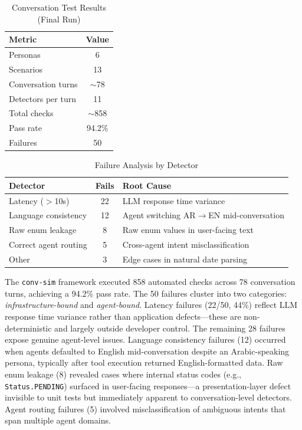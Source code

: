 \documentclass[11pt,a4paper]{article}
\begin{document}
\begin{table}[htbp]
\caption{Conversation Test Results (Final Run)}
\label{tab:convtest}
\centering
\begin{tabular}{@{}lc@{}}
\toprule
\textbf{Metric} & \textbf{Value} \\
\midrule
Personas & 6 \\
Scenarios & 13 \\
Conversation turns & $\sim$78 \\
Detectors per turn & 11 \\
Total checks & $\sim$858 \\
Pass rate & 94.2\% \\
Failures & 50 \\
\bottomrule
\end{tabular}
\end{table}

\begin{table}[htbp]
\caption{Failure Analysis by Detector}
\label{tab:failureanalysis}
\centering
\footnotesize
\begin{tabular}{@{}lcp{3.5cm}@{}}
\toprule
\textbf{Detector} & \textbf{Fails} & \textbf{Root Cause} \\
\midrule
Latency ($>$10s) & 22 & LLM response time variance \\
Language consistency & 12 & Agent switching AR$\rightarrow$EN mid-conversation \\
Raw enum leakage & 8 & Raw enum values in user-facing text \\
Correct agent routing & 5 & Cross-agent intent misclassification \\
Other & 3 & Edge cases in natural date parsing \\
\bottomrule
\end{tabular}
\end{table}

The \texttt{conv-sim} framework executed 858 automated checks across 78 conversation turns, achieving a 94.2\% pass rate. The 50 failures cluster into two categories: \textit{infrastructure-bound} and \textit{agent-bound}. Latency failures (22/50, 44\%) reflect LLM response time variance rather than application defects---these are non-deterministic and largely outside developer control. The remaining 28 failures expose genuine agent-level issues. Language consistency failures (12) occurred when agents defaulted to English mid-conversation despite an Arabic-speaking persona, typically after tool execution returned English-formatted data. Raw enum leakage (8) revealed cases where internal status codes (e.g., \texttt{Status.PENDING}) surfaced in user-facing responses---a presentation-layer defect invisible to unit tests but immediately apparent to conversation-level detectors. Agent routing failures (5) involved misclassification of ambiguous intents that span multiple agent domains.
\end{document}
